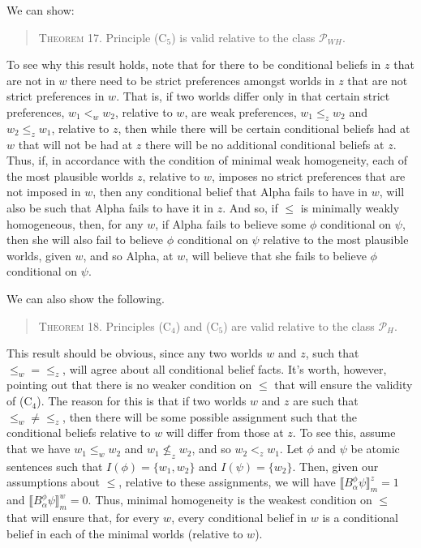 We can show:
\begin{quote}
\textsc{Theorem 17.}\; Principle (C$_5$) is valid relative to the class $\mathcal{P}_{WH}$.
\end{quote} 
To see why this result holds, note that for there to be conditional beliefs in $z$ that are not in $w$ there need to be strict preferences amongst worlds in $z$ that are not strict preferences in $w$.
That is, if two worlds differ only in that certain strict preferences, $w_1 <_w w_2$, relative to $w$, are weak preferences, $w_1 \leq_z w_2$ and $w_2 \leq_z w_1$, relative to $z$, then while there will be certain conditional beliefs had at $w$ that will not be had at $z$ there will be no additional conditional beliefs at $z$. 
Thus, if, in accordance with the condition of minimal weak homogeneity, each of the most plausible worlds $z$, relative to $w$, imposes no strict preferences that are not imposed in $w$, then any conditional belief that Alpha fails to have in $w$, will also be such that Alpha fails to have it in $z$.
And so, if $\leq$ is minimally weakly homogeneous, then, for any $w$, if Alpha fails to believe some $\phi$ conditional on $\psi$, then she will also fail to believe $\phi$ conditional on $\psi$ relative to the most plausible worlds, given $w$, and so Alpha, at $w$, will believe that she fails to believe $\phi$ conditional on $\psi$.

We can also show the following.
\begin{quote}
\textsc{Theorem 18.}\; Principles (C$_4$) and (C$_5$) are valid relative to the class $\mathcal{P}_{H}$.
\end{quote}
This result should be obvious, since any two worlds $w$ and $z$, such that $\leq_w = \leq_z$, will agree about all conditional belief facts.
It's worth, however, pointing out that there is no weaker condition on $\leq$ that will ensure the validity of (C$_4$).
The reason for this is that if two worlds $w$ and $z$ are such that $\leq_w \neq \leq_z$, then there will be some possible assignment such that the conditional beliefs relative to $w$ will differ from those at $z$.
To see this, assume that we have $w_1 \leq_w w_2$ and $w_1 \not \leq_z w_2$, and so $w_2 <_z w_1$. 
Let $\phi$ and $\psi$ be atomic sentences such that $I(\phi) = \{w_1, w_2 \}$ and $I(\psi) = \{w_2\}$.
Then, given our assumptions about $\leq$, relative to these assignments, we will have $\llbracket B_\alpha^\phi \psi \rrbracket_m^z = 1$ and $\llbracket B_\alpha^\phi \psi \rrbracket_m^w = 0$.
Thus, minimal homogeneity is the weakest condition on $\leq$ that will ensure that, for every $w$, every conditional belief in $w$ is a conditional belief in each of the minimal worlds (relative to $w$).

